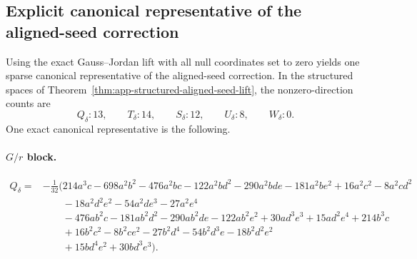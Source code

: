 \documentclass[11pt]{article}
\begin{document}
\subsection{Explicit canonical representative of the aligned-seed correction}
\label{app:structured-aligned-seed-explicit}

Using the exact Gauss--Jordan lift with all null coordinates set to zero yields
one sparse canonical representative of the aligned-seed correction.  In the
structured spaces of Theorem~\ref{thm:app-structured-aligned-seed-lift}, the
nonzero-direction counts are
\begin{equation}
Q_\delta:13,
\qquad
T_\delta:14,
\qquad
S_\delta:12,
\qquad
U_\delta:8,
\qquad
W_\delta:0.
\label{eq:app-structured-aligned-seed-nonzero-counts}
\end{equation}
One exact canonical representative is the following.

\paragraph{$G/r$ block.}
\begin{equation}
\begin{aligned}
Q_\delta={}&-\frac{1}{32}\Big(
214 a^3 c - 698 a^2 b^2 - 476 a^2 b c - 122 a^2 b d^2 - 290 a^2 b d e - 181 a^2 b e^2
+ 16 a^2 c^2 - 8 a^2 c d^2
\\
&\hspace{2em}- 18 a^2 d^2 e^2 - 54 a^2 d e^3 - 27 a^2 e^4
\\
&\hspace{2em}- 476 a b^2 c - 181 a b^2 d^2 - 290 a b^2 d e - 122 a b^2 e^2
+ 30 a d^3 e^3 + 15 a d^2 e^4 + 214 b^3 c
\\
&\hspace{2em}+ 16 b^2 c^2 - 8 b^2 c e^2 - 27 b^2 d^4 - 54 b^2 d^3 e - 18 b^2 d^2 e^2
\\
&\hspace{2em}+ 15 b d^4 e^2 + 30 b d^3 e^3
\Big).
\end{aligned}
\label{eq:app-structured-aligned-seed-Qdelta}
\end{equation}
\end{document}
